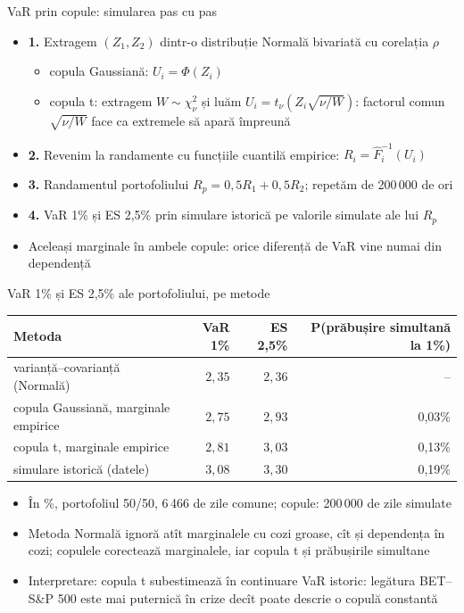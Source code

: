 \begin{frame}{VaR prin copule: simularea pas cu pas}
\itemsize{\small}
\begin{itemize}
    \item \textbf{1.} Extragem $(Z_1, Z_2)$ dintr-o distribuție Normală bivariată cu corelația $\rho$
    \begin{itemize}
        \item copula Gaussiană: $U_i = \Phi(Z_i)$
        \item copula t: extragem $W \sim \chi^2_\nu$ și luăm $U_i = t_\nu(Z_i\sqrt{\nu/W})$: factorul comun $\sqrt{\nu/W}$ face ca extremele să apară împreună
    \end{itemize}
    \item \textbf{2.} Revenim la randamente cu funcțiile cuantilă empirice: $R_i = \hat F_i^{-1}(U_i)$
    \item \textbf{3.} Randamentul portofoliului $R_p = 0{,}5R_1 + 0{,}5R_2$; repetăm de 200\,000 de ori
    \item \textbf{4.} VaR 1\% și ES 2,5\% prin simulare istorică pe valorile simulate ale lui $R_p$
    \item Aceleași marginale în ambele copule: orice diferență de VaR vine numai din dependență
\end{itemize}
\end{frame}

\begin{frame}{VaR 1\% și ES 2,5\% ale portofoliului, pe metode}
\itemsize{\footnotesize}
\begin{center}
\footnotesize
\begin{tabular}{lrrr}
\toprule
Metoda & VaR 1\% & ES 2,5\% & P(prăbușire simultană la 1\%) \\
\midrule
varianță--covarianță (Normală) & $2{,}35$ & $2{,}36$ & -- \\
copula Gaussiană, marginale empirice & $2{,}75$ & $2{,}93$ & 0{,}03\% \\
copula t, marginale empirice & $2{,}81$ & $3{,}03$ & 0{,}13\% \\
simulare istorică (datele) & $3{,}08$ & $3{,}30$ & 0{,}19\% \\
\bottomrule
\end{tabular}
\end{center}
\begin{itemize}
    \item În \%, portofoliul 50/50, 6\,466 de zile comune; copule: 200\,000 de zile simulate
    \item Metoda Normală ignoră atît marginalele cu cozi groase, cît și dependența în cozi; copulele corectează marginalele, iar copula t și prăbușirile simultane
    \item Interpretare: copula t subestimează în continuare VaR istoric: legătura BET--S\&P 500 este mai puternică în crize decît poate descrie o copulă constantă
\end{itemize}
\end{frame}


